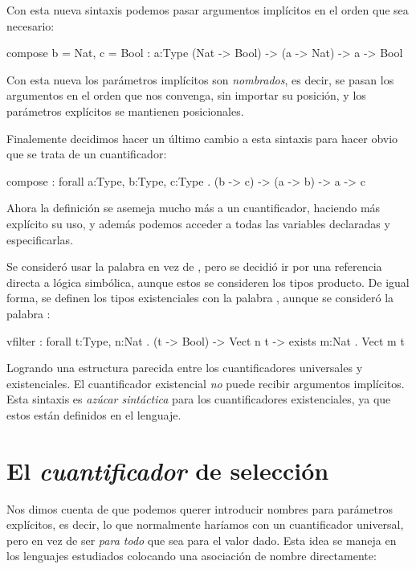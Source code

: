 {\begin{designfr}
Con esta nueva sintaxis podemos pasar argumentos implícitos en el orden que sea necesario:

\begin{anglercode}
compose { b = Nat, c = Bool } : { a:Type } (Nat -> Bool) -> (a -> Nat) -> a -> Bool
\end{anglercode}

Con esta nueva los parámetros implícitos son \emph{nombrados}, es decir, se pasan los argumentos en el orden que nos convenga, sin importar su posición, y los parámetros explícitos se mantienen posicionales.

Finalemente decidimos hacer un último cambio a esta sintaxis para hacer obvio que se trata de un cuantificador:

\begin{anglercode}
compose : forall a:Type, b:Type, c:Type . (b -> c) -> (a -> b) -> a -> c
\end{anglercode}

Ahora la definición se asemeja mucho más a un cuantificador, haciendo más explícito su uso, y además podemos acceder a todas las variables declaradas y especificarlas.

Se consideró usar la palabra  en vez de , pero se decidió ir por una referencia directa a lógica simbólica, aunque estos se consideren los tipos producto. De igual forma, se definen los tipos existenciales con la palabra , aunque se consideró la palabra :

\begin{anglercode}
vfilter : forall t:Type, n:Nat . (t -> Bool) -> Vect n t -> exists m:Nat . Vect m t
\end{anglercode}

Logrando una estructura parecida entre los cuantificadores universales y existenciales. El cuantificador existencial \emph{no} puede recibir argumentos implícitos. Esta sintaxis es \emph{azúcar sintáctica} para los cuantificadores existenciales, ya que estos están definidos en el lenguaje.
\end{designfr}

\section{El \emph{cuantificador} de selección}

\begin{designfr}
Nos dimos cuenta de que podemos querer introducir nombres para parámetros explícitos, es decir, lo que normalmente haríamos con un cuantificador universal, pero en vez de ser \emph{para todo} que sea para el valor dado. Esta idea se maneja en los lenguajes estudiados colocando una asociación de nombre directamente:


\end{designfr}}
